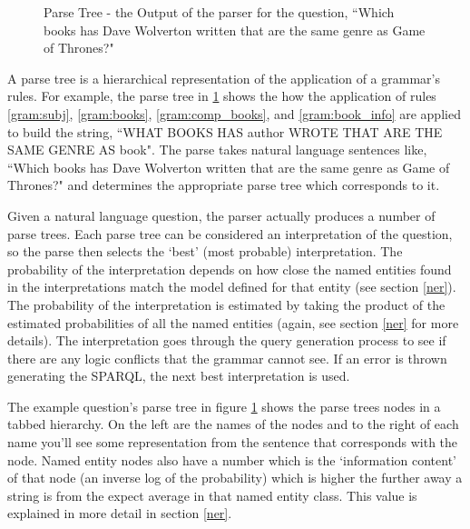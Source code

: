 \documentclass[11pt]{article}
\begin{document}
\begin{figure}[h!]
\caption{Parse Tree - the Output of the parser for the question, 
``Which books has Dave Wolverton written that are the same genre as Game of Thrones?"}
\label{fig:parse}
\end{figure}

A parse tree is a hierarchical representation of the application of a grammar's rules.
For example, the parse tree in \ref{fig:parse} shows the how the application of rules
\ref{gram:subj}, \ref{gram:books}, \ref{gram:comp_books}, and \ref{gram:book_info}
are applied to build the string, 
``WHAT BOOKS HAS author WROTE THAT ARE THE SAME GENRE AS book". The parse takes
natural language sentences like, ``Which books has Dave Wolverton written that
are the same genre as Game of Thrones?" and determines the appropriate parse tree which
corresponds to it.

Given a natural language question, the parser actually produces a number of
parse trees. Each parse tree can be considered an interpretation of the question,
so the parse then selects the `best' (most probable) interpretation. The probability
of the interpretation depends on how close the named entities found in 
the interpretations match the model defined for that entity (see section \ref{ner}). 
The probability of the interpretation is estimated by taking the product of the 
estimated probabilities of all the named entities (again, see section \ref{ner} for
more details). The interpretation goes through the query generation process to see if 
there are any logic conflicts that the grammar cannot see. If an error is thrown generating the
SPARQL, the next best interpretation is used.

The example question's parse tree in figure \ref{fig:parse} shows the parse trees nodes
in a tabbed hierarchy. On the left are the names of the nodes and to
the right of each name you'll see some representation from the sentence that 
corresponds with the node. Named entity nodes also have a number which is the
`information content' of that node (an inverse log of the probability) which is higher
the further away a string is from the expect average in that named entity class.
This value is explained in more detail in section \ref{ner}.
\end{document}
